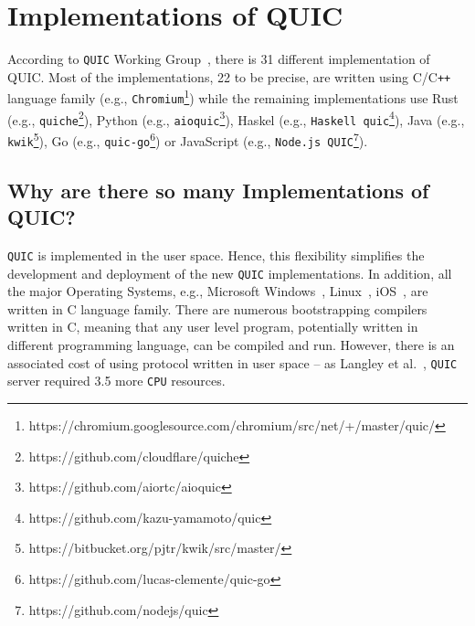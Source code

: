 \documentclass[12pt,a4paper,twoside,openright]{report}
\begin{document}
\section{Implementations of QUIC} \label{List_of_QUIC_implementations}
According to \texttt{QUIC} Working Group~\cite{number_of_QUIC_implementations}, there is 31 different implementation of QUIC. Most of the implementations, 22 to be precise, are written using C/C\texttt{++} language family (e.g., \texttt{Chromium}\footnote{https://chromium.googlesource.com/chromium/src/net/+/master/quic/}) while the remaining implementations use Rust (e.g., \texttt{quiche}\footnote{https://github.com/cloudflare/quiche}), Python (e.g., \texttt{aioquic}\footnote{https://github.com/aiortc/aioquic}), Haskel (e.g., \texttt{Haskell quic}\footnote{https://github.com/kazu-yamamoto/quic}), Java (e.g., \texttt{kwik}\footnote{https://bitbucket.org/pjtr/kwik/src/master/}), Go (e.g., \texttt{quic-go}\footnote{https://github.com/lucas-clemente/quic-go}) or JavaScript (e.g., \texttt{Node.js QUIC}\footnote{https://github.com/nodejs/quic}).


\subsection{Why are there so many Implementations of QUIC?}

\texttt{QUIC} is implemented in the user space.
Hence, this flexibility simplifies the development and deployment of the new \texttt{QUIC} implementations.
In addition, all the major Operating Systems, e.g., Microsoft Windows~\cite{OS_implementations}, Linux~\cite{OS_implementations, linux_kernel_programming_language}, iOS~\cite{OS_implementations, IOKitFundamentals}, are written in C language family.
There are numerous bootstrapping compilers written in C, meaning that any user level program, potentially written in different programming language, can be compiled and run.
However, there is an associated cost of using protocol written in user space -- as Langley et al.~\cite{QUIC_SERVER_REQUIRES_3-5_more_CPU_resources}, \texttt{QUIC} server required 3.5 more \texttt{CPU} resources.
\end{document}
